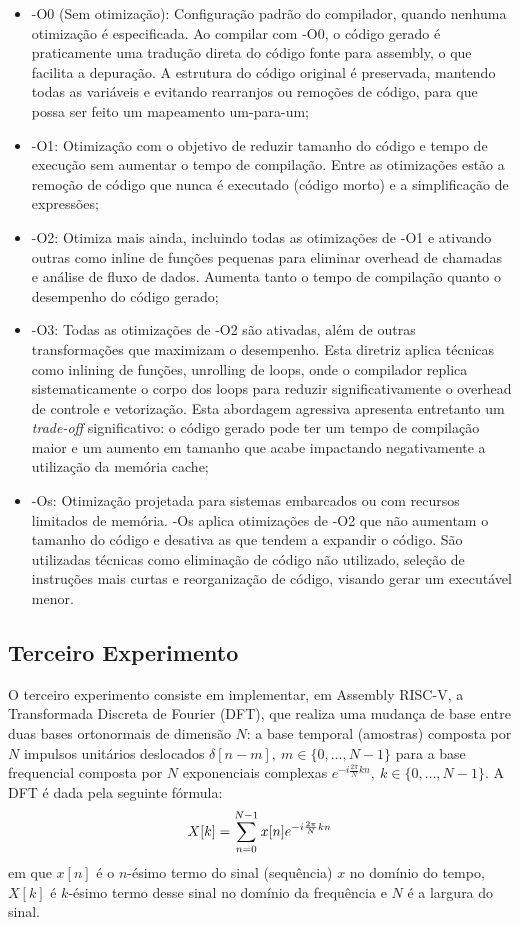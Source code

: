 \documentclass[a4paper,12pt]{article}
\begin{document}
\begin{itemize}
    \item -O0 (Sem otimização): Configuração padrão do compilador, quando nenhuma otimização é especificada. Ao compilar com -O0, o código gerado é praticamente uma tradução direta do código fonte para assembly, o que facilita a depuração. A estrutura do código original é preservada, mantendo todas as variáveis e evitando rearranjos ou remoções de código, para que possa ser feito um mapeamento um-para-um;
    \item -O1: Otimização com o objetivo de reduzir tamanho do código e tempo de execução sem aumentar o tempo de compilação. Entre as otimizações estão a remoção de código que nunca é executado (código morto) e a simplificação de expressões;
    \item -O2: Otimiza mais ainda, incluindo todas as otimizações de -O1 e ativando outras como inline de funções pequenas para eliminar overhead de chamadas e análise de fluxo de dados. Aumenta tanto o tempo de compilação quanto o desempenho do código gerado;
    \item -O3: Todas as otimizações de -O2 são ativadas, além de outras transformações que maximizam o desempenho. Esta diretriz aplica técnicas como inlining de funções, unrolling de loops, onde o compilador replica sistematicamente o corpo dos loops para reduzir significativamente o overhead de controle e vetorização. Esta abordagem agressiva apresenta entretanto um \textit{trade-off} significativo: o código gerado pode ter um tempo de compilação maior e um aumento em tamanho que acabe impactando negativamente a utilização da memória cache;
    \item -Os: Otimização projetada para sistemas embarcados ou com recursos limitados de memória. -Os aplica otimizações de -O2 que não aumentam o tamanho do código e desativa as que tendem a expandir o código. São utilizadas técnicas como eliminação de código não utilizado, seleção de instruções mais curtas e reorganização de código, visando gerar um executável menor.
\end{itemize}

\newpage

\subsection{Terceiro Experimento}
O terceiro experimento consiste em implementar, em Assembly RISC-V, a Transformada Discreta de Fourier (DFT), que realiza uma mudança de base entre duas bases ortonormais de dimensão $N$: a base temporal (amostras) composta por $N$ impulsos unitários deslocados $\delta[n-m],\ m \in \{0, \dots, N-1\}$ para a base frequencial composta por $N$ exponenciais complexas $e^{-i\frac{2\pi}{N}kn},\ k \in \{0, \dots, N-1\}$. A DFT é dada pela seguinte fórmula:
\vspace{-10pt}
\begin{equation}
    X[k] = \sum_{n=0}^{N-1} x[n]e^{-i\frac{2\pi}{N}kn}
    \vspace{-8pt}
\end{equation}
em que $x[n]$ é o $n$-ésimo termo do sinal (sequência) $x$ no domínio do tempo, $X[k]$ é $k$-ésimo termo desse sinal no domínio da frequência e $N$ é a largura do sinal.
\end{document}
